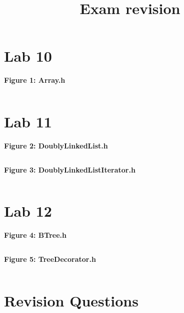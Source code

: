 \documentclass[11pt, letterpaper]{article}
\title{Exam revision}
\author{}
\date{}
\newcommand{\includeminted}[3]
{
  \begin{center}
  \textbf{#1}
  \vspace{-5pt}
  \inputminted[linenos, breaklines]{#2}{#3}
  \end{center}
}
\begin{document}
\normalsize
\section{Lab 10}
\includeminted{Figure 1: Array.h}{cpp}{../10/src/Array.h}
\clearpage
\section{Lab 11}
\includeminted{Figure 2: DoublyLinkedList.h}{cpp}{../11/src/DoublyLinkedList.h}
\clearpage
\includeminted{Figure 3: DoublyLinkedListIterator.h}{cpp}{../11/src/DoublyLinkedListIterator.h}
\clearpage
\section{Lab 12}
\includeminted{Figure 4: BTree.h}{cpp}{../12/src/BTree.h}
\clearpage
\includeminted{Figure 5: TreeDecorator.h}{cpp}{../12/src/TreeDecorator.h}
\clearpage
\section*{Revision Questions}
\setlength{\parskip}{0.5em}

\end{document}
